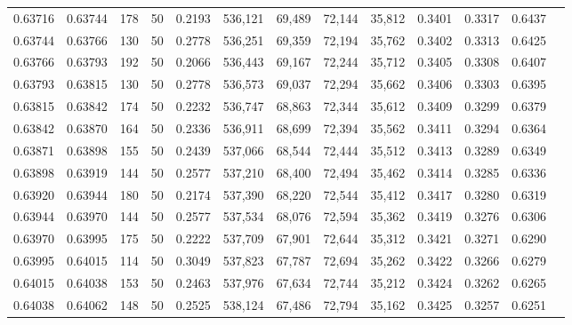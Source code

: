 \begin{tabular}{rrrrrrrrrrrrr}
0.63716 & 0.63744 &   178 &  50 &                                     0.2193 & 536,121 &  69,489 &  72,144 &  35,812 & 0.3401 & 0.3317 & 0.6437 \\
0.63744 & 0.63766 &   130 &  50 &                                     0.2778 & 536,251 &  69,359 &  72,194 &  35,762 & 0.3402 & 0.3313 & 0.6425 \\
0.63766 & 0.63793 &   192 &  50 &                                     0.2066 & 536,443 &  69,167 &  72,244 &  35,712 & 0.3405 & 0.3308 & 0.6407 \\
0.63793 & 0.63815 &   130 &  50 &                                     0.2778 & 536,573 &  69,037 &  72,294 &  35,662 & 0.3406 & 0.3303 & 0.6395 \\
0.63815 & 0.63842 &   174 &  50 &                                     0.2232 & 536,747 &  68,863 &  72,344 &  35,612 & 0.3409 & 0.3299 & 0.6379 \\
0.63842 & 0.63870 &   164 &  50 &                                     0.2336 & 536,911 &  68,699 &  72,394 &  35,562 & 0.3411 & 0.3294 & 0.6364 \\
0.63871 & 0.63898 &   155 &  50 &                                     0.2439 & 537,066 &  68,544 &  72,444 &  35,512 & 0.3413 & 0.3289 & 0.6349 \\
0.63898 & 0.63919 &   144 &  50 &                                     0.2577 & 537,210 &  68,400 &  72,494 &  35,462 & 0.3414 & 0.3285 & 0.6336 \\
0.63920 & 0.63944 &   180 &  50 &                                     0.2174 & 537,390 &  68,220 &  72,544 &  35,412 & 0.3417 & 0.3280 & 0.6319 \\
0.63944 & 0.63970 &   144 &  50 &                                     0.2577 & 537,534 &  68,076 &  72,594 &  35,362 & 0.3419 & 0.3276 & 0.6306 \\
0.63970 & 0.63995 &   175 &  50 &                                     0.2222 & 537,709 &  67,901 &  72,644 &  35,312 & 0.3421 & 0.3271 & 0.6290 \\
0.63995 & 0.64015 &   114 &  50 &                                     0.3049 & 537,823 &  67,787 &  72,694 &  35,262 & 0.3422 & 0.3266 & 0.6279 \\
0.64015 & 0.64038 &   153 &  50 &                                     0.2463 & 537,976 &  67,634 &  72,744 &  35,212 & 0.3424 & 0.3262 & 0.6265 \\
0.64038 & 0.64062 &   148 &  50 &                                     0.2525 & 538,124 &  67,486 &  72,794 &  35,162 & 0.3425 & 0.3257 & 0.6251 \\

\end{tabular}
